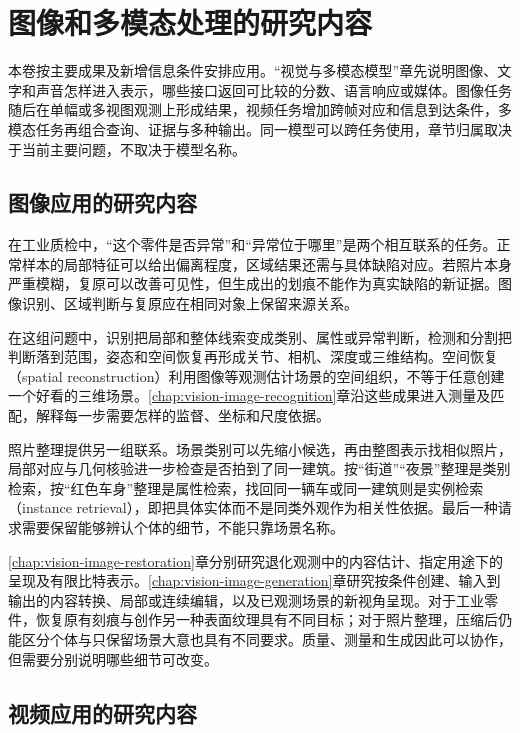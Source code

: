 \section{图像和多模态处理的研究内容}
\label{sec:vision-overview-tasks}

本卷按主要成果及新增信息条件安排应用。“视觉与多模态模型”章先说明图像、文字和声音怎样进入表示，哪些接口返回可比较的分数、语言响应或媒体。图像任务随后在单幅或多视图观测上形成结果，视频任务增加跨帧对应和信息到达条件，多模态任务再组合查询、证据与多种输出。同一模型可以跨任务使用，章节归属取决于当前主要问题，不取决于模型名称。

\subsection{图像应用的研究内容}
\label{sec:vision-overview-image-tasks}

在工业质检中，“这个零件是否异常”和“异常位于哪里”是两个相互联系的任务。正常样本的局部特征可以给出偏离程度，区域结果还需与具体缺陷对应。若照片本身严重模糊，复原可以改善可见性，但生成出的划痕不能作为真实缺陷的新证据。图像识别、区域判断与复原应在相同对象上保留来源关系。

在这组问题中，识别把局部和整体线索变成类别、属性或异常判断，检测和分割把判断落到范围，姿态和空间恢复再形成关节、相机、深度或三维结构。空间恢复（spatial reconstruction）利用图像等观测估计场景的空间组织，不等于任意创建一个好看的三维场景。\ref{chap:vision-image-recognition}章沿这些成果进入测量及匹配，解释每一步需要怎样的监督、坐标和尺度依据。

照片整理提供另一组联系。场景类别可以先缩小候选，再由整图表示找相似照片，局部对应与几何核验进一步检查是否拍到了同一建筑。按“街道”“夜景”整理是类别检索，按“红色车身”整理是属性检索，找回同一辆车或同一建筑则是实例检索（instance retrieval），即把具体实体而不是同类外观作为相关性依据。最后一种请求需要保留能够辨认个体的细节，不能只靠场景名称。

\ref{chap:vision-image-restoration}章分别研究退化观测中的内容估计、指定用途下的呈现及有限比特表示。\ref{chap:vision-image-generation}章研究按条件创建、输入到输出的内容转换、局部或连续编辑，以及已观测场景的新视角呈现。对于工业零件，恢复原有刻痕与创作另一种表面纹理具有不同目标；对于照片整理，压缩后仍能区分个体与只保留场景大意也具有不同要求。质量、测量和生成因此可以协作，但需要分别说明哪些细节可改变。

\subsection{视频应用的研究内容}
\label{sec:vision-overview-video-tasks}

